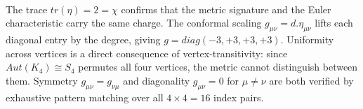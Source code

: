 \documentclass[11pt,a4paper]{book}
\def\cdot{.}%
\def\mathrm#1{#1}%
\begin{document}
\begin{code}
\\
\>[0]\AgdaSpace{}%
\AgdaSymbol{:}\AgdaSpace{}%
\<%
\\
\>[0]\AgdaSpace{}%
\AgdaSymbol{=}%
\>[8416I]\AgdaSpace{}%
\AgdaSpace{}%
\AgdaSpace{}%
\<%
\\
\>[.][@{}l@{}]\<[8416I]%
\>[17]\AgdaSpace{}%
\AgdaSpace{}%
\AgdaSpace{}%
\<%
\\
%
\>[17]\AgdaSpace{}%
\AgdaSpace{}%
\AgdaSpace{}%
\<%
\\
%
\>[17]\AgdaSpace{}%
\AgdaSpace{}%
\<%
\\
%
\\[\AgdaEmptyExtraSkip]%
\>[0]\<%
\\
\>[0][@{}l@{\AgdaIndent{0}}]%
\>[2]\AgdaSpace{}%
\<%
\\
%
\\[\AgdaEmptyExtraSkip]%
%
\>[2]\AgdaSpace{}%
\AgdaSymbol{:}\AgdaSpace{}%
\AgdaSpace{}%
\AgdaSpace{}%
\AgdaSpace{}%
\<%
\\
%
\>[2]\AgdaSpace{}%
\AgdaSymbol{=}\AgdaSpace{}%
\<%
\end{code}

The trace $\mathrm{tr}(\eta) = 2 = \chi$ confirms that the metric signature
and the Euler characteristic carry the same charge.  The conformal scaling
$g_{\mu\nu} = d \cdot \eta_{\mu\nu}$ lifts each diagonal entry by the degree,
giving $g = \mathrm{diag}(-3, +3, +3, +3)$.  Uniformity across vertices is a
direct consequence of vertex-transitivity: since $\mathrm{Aut}(K_4) \cong S_4$
permutes all four vertices, the metric cannot distinguish between them.
Symmetry $g_{\mu\nu} = g_{\nu\mu}$ and diagonality
$g_{\mu\nu} = 0$ for $\mu \neq \nu$ are both verified by exhaustive pattern
matching over all $4 \times 4 = 16$ index pairs.
\end{document}
